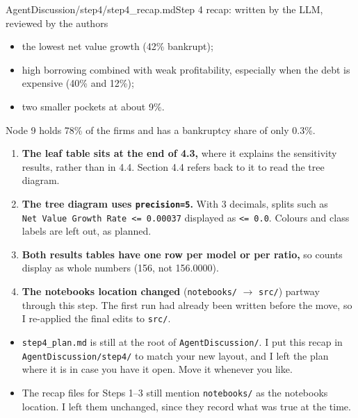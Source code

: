 \begin{mdfile}{AgentDiscussion/\allowbreak{}step4/\allowbreak{}step4\_recap.md}{Step 4 recap: written by the LLM, reviewed by the authors}
\begin{itemize}
  \begin{itemize}
  \tightlist
  \item
    the lowest net value growth (42\% bankrupt);
  \item
    high borrowing combined with weak profitability, especially when the debt is expensive (40\% and 12\%);
  \item
    two smaller pockets at about 9\%.
  \end{itemize}

  Node 9 holds 78\% of the firms and has a bankruptcy share of only 0.3\%.
\end{itemize}


\begin{enumerate}
\def\labelenumi{\arabic{enumi}.}
\tightlist
\item
  \textbf{The leaf table sits at the end of 4.3,} where it explains the sensitivity results, rather than in 4.4. Section 4.4 refers back to it to read the tree diagram.
\item
  \textbf{The tree diagram uses \texttt{precision=5}.} With 3 decimals, splits such as \texttt{Net\ Value\ Growth\ Rate\ \textless{}=\ 0.00037} displayed as \texttt{\textless{}=\ 0.0}. Colours and class labels are left out, as planned.
\item
  \textbf{Both results tables have one row per model or per ratio,} so counts display as whole numbers (156, not 156.0000).
\item
  \textbf{The notebook\textquotesingle s location changed} (\texttt{notebooks/} \ensuremath{\rightarrow} \texttt{src/}) partway through this step. The first run had already been written before the move, so I re-applied the final edits to \texttt{src/}.
\end{enumerate}


\begin{itemize}
\tightlist
\item
  \texttt{step4\_plan.md} is still at the root of \texttt{AgentDiscussion/}. I put this recap in \texttt{AgentDiscussion/step4/} to match your new layout, and I left the plan where it is in case you have it open. Move it whenever you like.
\item
  The recap files for Steps 1--3 still mention \texttt{notebooks/} as the notebook\textquotesingle s location. I left them unchanged, since they record what was true at the time.
\end{itemize}
\end{mdfile}
